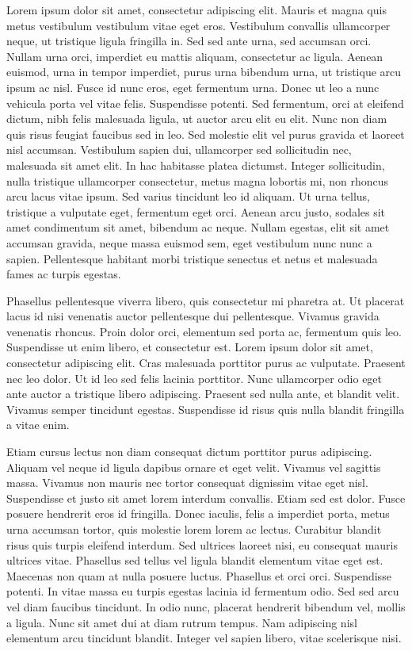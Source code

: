 Lorem ipsum dolor sit amet, consectetur adipiscing elit. Mauris et magna quis metus vestibulum vestibulum vitae eget eros. Vestibulum convallis ullamcorper neque, ut tristique ligula fringilla in. Sed sed ante urna, sed accumsan orci. Nullam urna orci, imperdiet eu mattis aliquam, consectetur ac ligula. Aenean euismod, urna in tempor imperdiet, purus urna bibendum urna, ut tristique arcu ipsum ac nisl. Fusce id nunc eros, eget fermentum urna. Donec ut leo a nunc vehicula porta vel vitae felis. Suspendisse potenti. Sed fermentum, orci at eleifend dictum, nibh felis malesuada ligula, ut auctor arcu elit eu elit. Nunc non diam quis risus feugiat faucibus sed in leo. Sed molestie elit vel purus gravida et laoreet nisl accumsan. Vestibulum sapien dui, ullamcorper sed sollicitudin nec, malesuada sit amet elit. In hac habitasse platea dictumst. Integer sollicitudin, nulla tristique ullamcorper consectetur, metus magna lobortis mi, non rhoncus arcu lacus vitae ipsum. Sed varius tincidunt leo id aliquam. Ut urna tellus, tristique a vulputate eget, fermentum eget orci. Aenean arcu justo, sodales sit amet condimentum sit amet, bibendum ac neque. Nullam egestas, elit sit amet accumsan gravida, neque massa euismod sem, eget vestibulum nunc nunc a sapien. Pellentesque habitant morbi tristique senectus et netus et malesuada fames ac turpis egestas.

Phasellus pellentesque viverra libero, quis consectetur mi pharetra at. Ut placerat lacus id nisi venenatis auctor pellentesque dui pellentesque. Vivamus gravida venenatis rhoncus. Proin dolor orci, elementum sed porta ac, fermentum quis leo. Suspendisse ut enim libero, et consectetur est. Lorem ipsum dolor sit amet, consectetur adipiscing elit. Cras malesuada porttitor purus ac vulputate. Praesent nec leo dolor. Ut id leo sed felis lacinia porttitor. Nunc ullamcorper odio eget ante auctor a tristique libero adipiscing. Praesent sed nulla ante, et blandit velit. Vivamus semper tincidunt egestas. Suspendisse id risus quis nulla blandit fringilla a vitae enim.

Etiam cursus lectus non diam consequat dictum porttitor purus adipiscing. Aliquam vel neque id ligula dapibus ornare et eget velit. Vivamus vel sagittis massa. Vivamus non mauris nec tortor consequat dignissim vitae eget nisl. Suspendisse et justo sit amet lorem interdum convallis. Etiam sed est dolor. Fusce posuere hendrerit eros id fringilla. Donec iaculis, felis a imperdiet porta, metus urna accumsan tortor, quis molestie lorem lorem ac lectus. Curabitur blandit risus quis turpis eleifend interdum. Sed ultrices laoreet nisi, eu consequat mauris ultrices vitae. Phasellus sed tellus vel ligula blandit elementum vitae eget est. Maecenas non quam at nulla posuere luctus. Phasellus et orci orci. Suspendisse potenti. In vitae massa eu turpis egestas lacinia id fermentum odio. Sed sed arcu vel diam faucibus tincidunt. In odio nunc, placerat hendrerit bibendum vel, mollis a ligula. Nunc sit amet dui at diam rutrum tempus. Nam adipiscing nisl elementum arcu tincidunt blandit. Integer vel sapien libero, vitae scelerisque nisi.

